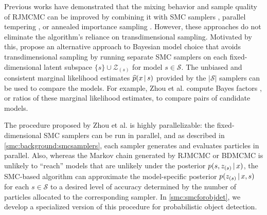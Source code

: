 \documentclass[
  12pt]{article}
\newcommand{\padvert}{\thinspace \vert \thinspace}
\begin{document}
Previous works have demonstrated that the mixing behavior and sample quality of RJMCMC can be improved by combining it with SMC samplers \citep{jasra2008interacting}, parallel tempering \citep{jasra2007population}, or annealed importance sampling \citep{karagiannis2013annealed}. However, these approaches do not eliminate the algorithm's reliance on transdimensional sampling. Motivated by this, \cite{zhou2016toward} propose an alternative approach to Bayesian model choice that avoids transdimensional sampling by running separate SMC samplers on each fixed-dimensional latent subspace $\{s\} \cup \mathcal{Z}_{(s)}$ for model $s \in \mathcal{S}$. The unbiased and consistent marginal likelihood estimates $\widehat{p}(x \padvert s)$ provided by the $\vert \mathcal{S} \vert$ samplers can be used to compare the models. For example, Zhou et al. compute Bayes factors \citep{kass1995bayes}, or ratios of these marginal likelihood estimates, to compare pairs of candidate models.

The procedure proposed by Zhou et al. is highly parallelizable: the fixed-dimensional SMC samplers can be run in parallel, and as described in \autoref{smc:background:smcsamplers}, each sampler generates and evaluates particles in parallel. Also, whereas the Markov chain generated by RJMCMC or BDMCMC is unlikely to ``reach'' models that are unlikely under the posterior $p(s, z_{(s)} \padvert x)$, the SMC-based algorithm can approximate the model-specific posterior $p(z_{(s)} \padvert x, s)$ for each $s \in \mathcal{S}$ to a desired level of accuracy determined by the number of particles allocated to the corresponding sampler. In \autoref{smc:smcforobjdet}, we develop a specialized version of this procedure for probabilistic object detection.




\end{document}
